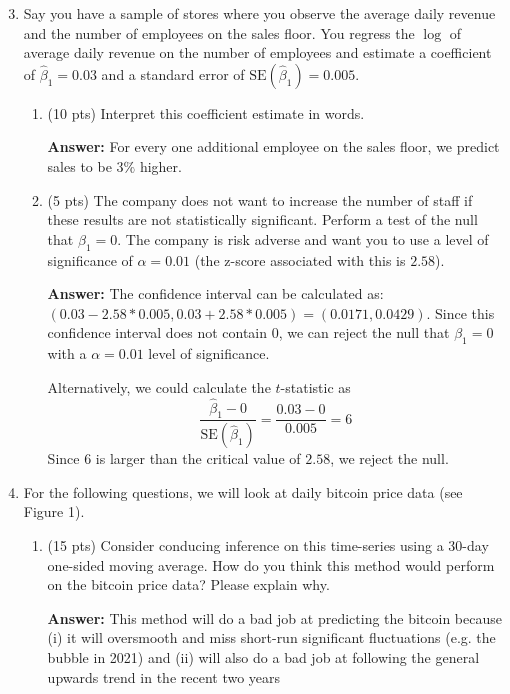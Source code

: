 \documentclass[12pt]{article}
\newcommand{\answer}[1]{{\color{blue_winged_teal}\textbf{Answer:} #1}}
\newcommand{\pts}[1]{{\color{zinc500}(#1 pts)}}
\begin{document}
\bigskip
\begin{enumerate}
  \setcounter{enumi}{2}
  \item Say you have a sample of stores where you observe the average daily revenue and the number of employees on the sales floor. You regress the $\log$ of average daily revenue on the number of employees and estimate a coefficient of $\hat{\beta}_1 = 0.03$ and a standard error of $\text{SE}(\hat{\beta}_1) = 0.005$. 
  \begin{enumerate}
    \item \pts{10} Interpret this coefficient estimate in words.
    
    \answer{
      For every one additional employee on the sales floor, we predict sales to be $3\%$ higher.
    }
    
    \item \pts{5} The company does not want to increase the number of staff if these results are not statistically significant. Perform a test of the null that $\beta_1 = 0$. The company is risk adverse and want you to use a level of significance of $\alpha = 0.01$ (the z-score associated with this is $2.58$). 
    
    \answer{
      The confidence interval can be calculated as: $(0.03 - 2.58 * 0.005, 0.03 + 2.58 * 0.005) = (0.0171, 0.0429)$. Since this confidence interval does not contain $0$, we can reject the null that $\beta_1 = 0$ with a $\alpha = 0.01$ level of significance.

      Alternatively, we could calculate the $t$-statistic as 
      $$
        \frac{\hat{\beta}_1 - 0}{\text{SE}(\hat{\beta}_1)} = \frac{0.03 - 0}{0.005} = 6
      $$
      Since $6$ is larger than the critical value of $2.58$, we reject the null.
    }
  \end{enumerate}
  
  \bigskip
  \item For the following questions, we will look at daily bitcoin price data (see Figure 1).
  \begin{enumerate}
    \item \pts{15} Consider conducing inference on this time-series using a 30-day one-sided moving average. How do you think this method would perform on the bitcoin price data? Please explain why.
    
    \answer{
      This method will do a bad job at predicting the bitcoin because (i) it will oversmooth and miss short-run significant fluctuations (e.g. the bubble in 2021) and (ii) will also do a bad job at following the general upwards trend in the recent two years 
    }
    

\end{enumerate}
\end{enumerate}
\end{document}
